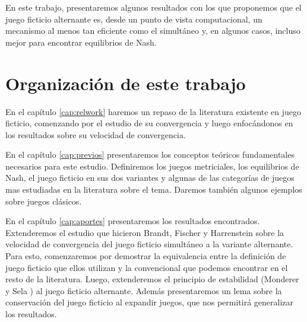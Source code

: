 En este trabajo, presentaremos algunos resultados con los que proponemos que el juego ficticio alternante es, desde un punto de vista computacional, un mecanismo al menos tan eficiente como el simultáneo y, en algunos casos, incluso mejor para encontrar equilibrios de Nash.


\section{Organización de este trabajo}

 En el capítulo \ref{cap:relwork} haremos un repaso de la literatura existente en juego ficticio, comenzando por el estudio de su convergencia y luego enfocándonos en los resultados sobre su velocidad de convergencia. 
 
 En el capítulo \ref{cap:previos} presentaremos los conceptos teóricos fundamentales necesarios para este estudio. Definiremos los juegos metriciales, los equilibrios de Nash, el juego ficticio en sus dos variantes y algunas de las categorías de juegos mas estudiadas en la literatura sobre el tema. Daremos también algunos ejemplos sobre juegos clásicos.

 En el capítulo \ref{cap:aportes} presentaremos los resultados encontrados. Extenderemos el estudio que hicieron Brandt, Fischer y Harrenstein \cite{brandt:rate:convergence} sobre la velocidad de convergencia del juego ficticio simultáneo a la variante alternante. Para esto, comenzaremos por demostrar la equivalencia entre la definición de juego ficticio que ellos utilizan y la convencional que podemos encontrar en el resto de la literatura. Luego, extenderemos el principio de estabilidad (Monderer y Sela \cite{no:cycling}) al juego ficticio alternante. Además presentaremos un lema sobre la conservación del juego ficticio al expandir juegos, que nos permitirá generalizar los resultados.